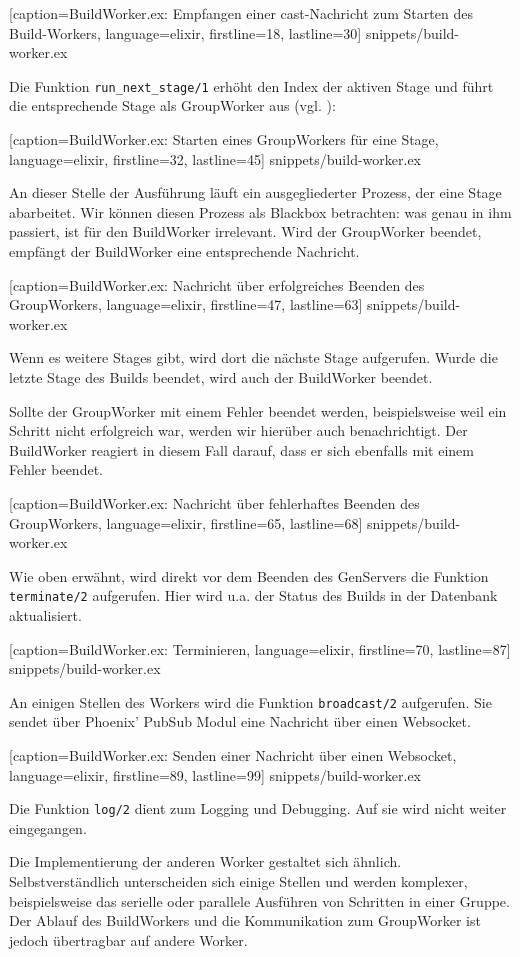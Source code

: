 
  [caption={BuildWorker.ex: Empfangen einer cast-Nachricht zum Starten des Build-Workers},
  language=elixir,
  firstline=18,
  lastline=30]
  {snippets/build-worker.ex}

Die Funktion \texttt{run\_\allowbreak next\_\allowbreak stage/1} erhöht den Index der aktiven Stage und führt die entsprechende Stage als GroupWorker aus (vgl. ):


  [caption={BuildWorker.ex: Starten eines GroupWorkers für eine Stage},
  language=elixir,
  firstline=32,
  lastline=45]
  {snippets/build-worker.ex}

An dieser Stelle der Ausführung läuft ein ausgegliederter Prozess, der eine Stage abarbeitet. Wir können diesen Prozess als Blackbox betrachten: was genau in ihm passiert, ist für den BuildWorker irrelevant. Wird der GroupWorker beendet, empfängt der BuildWorker eine entsprechende Nachricht.


  [caption={BuildWorker.ex: Nachricht über erfolgreiches Beenden des GroupWorkers},
  language=elixir,
  firstline=47,
  lastline=63]
  {snippets/build-worker.ex}

Wenn es weitere Stages gibt, wird dort die nächste Stage aufgerufen. Wurde die letzte Stage des Builds beendet, wird auch der BuildWorker beendet.

Sollte der GroupWorker mit einem Fehler beendet werden, beispielsweise weil ein Schritt nicht erfolgreich war, werden wir hierüber auch benachrichtigt. Der BuildWorker reagiert in diesem Fall darauf, dass er sich ebenfalls mit einem Fehler beendet.


  [caption={BuildWorker.ex: Nachricht über fehlerhaftes Beenden des GroupWorkers},
  language=elixir,
  firstline=65,
  lastline=68]
  {snippets/build-worker.ex}

Wie oben erwähnt, wird direkt vor dem Beenden des GenServers die Funktion \texttt{terminate/2} aufgerufen. Hier wird u.a. der Status des Builds in der Datenbank aktualisiert.


  [caption={BuildWorker.ex: Terminieren},
  language=elixir,
  firstline=70,
  lastline=87]
  {snippets/build-worker.ex}

An einigen Stellen des Workers wird die Funktion \texttt{broadcast/2} aufgerufen. Sie sendet über Phoenix' PubSub Modul eine Nachricht über einen Websocket.


  [caption={BuildWorker.ex: Senden einer Nachricht über einen Websocket},
  language=elixir,
  firstline=89,
  lastline=99]
  {snippets/build-worker.ex}

Die Funktion \texttt{log/2} dient zum Logging und Debugging. Auf sie wird nicht weiter eingegangen.

Die Implementierung der anderen Worker gestaltet sich ähnlich. Selbstverständlich unterscheiden sich einige Stellen und werden komplexer, beispielsweise das serielle oder parallele Ausführen von Schritten in einer Gruppe. Der Ablauf des BuildWorkers und die Kommunikation zum GroupWorker ist jedoch übertragbar auf andere Worker.

